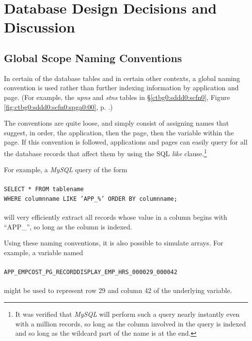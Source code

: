 \section{Database Design Decisions and Discussion}
\label{ctbg0:sddd0}


\subsection{Global Scope Naming Conventions}
\label{ctbg0:sddd0:sgsn0}

In certain of the database tables and in certain other
contexts, a global naming convention is used rather than
further indexing information by application and page.  (For
example, the \emph{upns} and \emph{stns} tables in 
\S{}\ref{ctbg0:sddd0:scfn0}, Figure
\ref{fig:ctbg0:sddd0:scfn0:spga0:00}, p. 
\pageref{fig:ctbg0:sddd0:scfn0:spga0:00}.)

The conventions are quite loose, and simply consist of assigning names
that suggest, in order, the application, then the page, then the 
variable within the page.
If this convention is followed, applications and pages can easily
query for all the database records that affect them by using the
SQL \emph{like} clause.\footnote{It was verified that \emph{MySQL} will
perform such a query nearly instantly even with a million records, so long
as the column involved in the query is indexed and so long as the wildcard
part of the name is at the end.}

For example, a \emph{MySQL} query of the form\\\\
\texttt{SELECT * FROM tablename\\WHERE columnname LIKE 'APP\_\%' ORDER BY columnname;}\\\\
will very efficiently extract all records whose value in a column
begins with ``APP\_'', so long as the column is indexed.

Using these naming conventions, it is also possible to simulate arrays.  For
example, a variable named\\\\
\texttt{APP\_EMPCOST\_PG\_RECORDDISPLAY\_EMP\_HRS\_000029\_000042}\\\\
might be used to represent row 29 and column 42 of the underlying variable.



